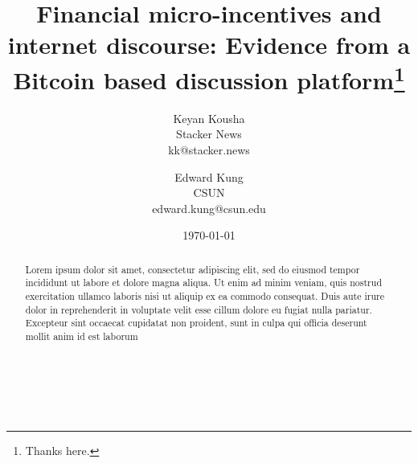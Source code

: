 \documentclass[12pt,english,hyperfootnotes=false,hidelinks]{article}
\title{
Financial micro-incentives and internet discourse: Evidence from a Bitcoin based discussion platform\thanks{
Thanks here.
}
}
\author{
    Keyan Kousha\\Stacker News\\kk@stacker.news \and
    Edward Kung\\CSUN\\edward.kung@csun.edu
}
\date{\today}
\begin{document}
\maketitle

\singlespacing

\vspace{-1cm}

\begin{abstract}
Lorem ipsum dolor sit amet, consectetur adipiscing elit, sed do eiusmod tempor incididunt ut labore et dolore magna aliqua. Ut enim ad minim veniam, quis nostrud exercitation ullamco laboris nisi ut aliquip ex ea commodo consequat. Duis aute irure dolor in reprehenderit in voluptate velit esse cillum dolore eu fugiat nulla pariatur. Excepteur sint occaecat cupidatat non proident, sunt in culpa qui officia deserunt mollit anim id est laborum
\end{abstract}


 \\
 \\


\doublespacing

\pagebreak








\pagebreak


\end{document}
